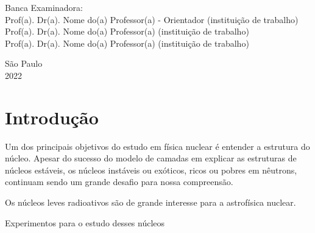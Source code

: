 \documentclass[a4paper,12pt,oneside]{book}
\begin{document}
\par
\leftskip 6cm
\par
\leftskip 0cm
\vskip 2cm


\noindent Banca Examinadora: \\
\noindent Prof(a). Dr(a). Nome do(a) Professor(a) - Orientador (institui\c{c}\~{a}o de trabalho) \\
Prof(a). Dr(a). Nome do(a) Professor(a) (institui\c{c}\~{a}o de trabalho) \\
Prof(a). Dr(a). Nome do(a) Professor(a) (institui\c{c}\~{a}o de trabalho) \\
\vspace{1.8cm}


\begin{center}
    {S\~ao Paulo \\  2022}
\end{center}%
    
\clearpage

\tableofcontents
\listoffigures
\listoftables
\listofalgorithms
\newpage

\chapter{Introdução}


\par Um dos principais objetivos do estudo em física nuclear é entender a estrutura do núcleo. Apesar do sucesso do modelo de camadas em explicar as estruturas de núcleos estáveis, os núcleos instáveis ou exóticos, ricos ou pobres em nêutrons, continuam sendo um grande desafio para nossa compreensão.

\par Os núcleos leves radioativos são de grande interesse para a astrofísica nuclear. 

\par Experimentos para o estudo desses núcleos 
\end{document}
